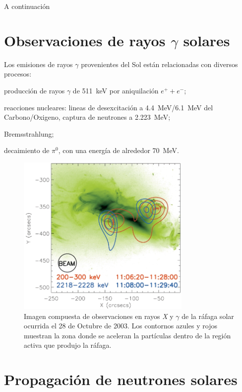 A continuación

\section{Observaciones de rayos $\gamma$ solares}

Los emisiones de rayos $\gamma$ provenientes del Sol están relacionadas con diversos procesos:
\begin{enumerate*}
  \item producción de rayos $\gamma$ de \SI{511}{\kilo\electronvolt} por aniquilación $e^{+}+e^{-}$;
  \item reacciones nucleares: lineas de desexcitación a \SI{4.4}{\mega\electronvolt}/\SI{6.1}{\mega\electronvolt} del Carbono/Oxigeno, captura de neutrones a \SI{2.223}{\mega\electronvolt};
  \item Bremsstrahlung;
  \item decaimiento de $\pi^{0}$, con una energía de alrededor \SI{70}{\mega\electronvolt}.
\end{enumerate*}



\begin{figure}
        \centering
        \includegraphics[width=0.75\textwidth]{flare-footprints}
        \caption{Imagen compuesta de observaciones en rayos \emph{X} y $\gamma$ de la ráfaga solar ocurrida el \num{28} de Octubre de \num{2003}. Los contornos azules y rojos muestran la zona donde se aceleran la partículas dentro de la región activa que produjo la ráfaga.}
        \label{fig:flare-foot}
\end{figure}

\section{Propagación de neutrones solares}

